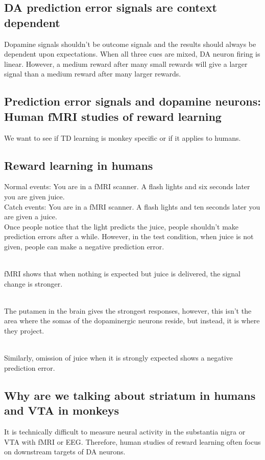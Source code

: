 \subsection{DA prediction error signals are context dependent}
Dopamine signals shouldn't be outcome signals and the results should always be dependent upon expectations. 
When all three cues are mixed, DA neuron firing is linear. However, a medium reward after many small rewards will give a larger signal than a medium reward after many larger rewards.
\subsection{Prediction error signals and dopamine neurons:
Human fMRI studies of reward learning}
We want to see if TD learning is monkey specific or if it applies to humans.

\subsection{Reward learning in humans} 
Normal events: You are in a fMRI scanner. A flash lights and six seconds later you are given juice.
\\Catch events: You are in a fMRI scanner. A flash lights and ten seconds later you are given a juice.
\\Once people notice that the light predicts the juice, people shouldn't make prediction errors after a while. However, in the test condition, when juice is not given, people can make a negative prediction error.

\\fMRI shows that when nothing is expected but juice is delivered, the signal change is stronger. 

\\The putamen in the brain gives the strongest responses, however, this isn't the area where the somas of the dopaminergic neurons reside, but instead, it is where they project.

\\Similarly, omission of juice when it is strongly expected shows a negative prediction error.
\subsection{Why are we talking about striatum in humans and VTA in monkeys}
It is technically difficult to measure neural activity in the substantia nigra or VTA with fMRI or EEG. Therefore, human studies of reward learning often focus on downstream targets of DA neurons.

